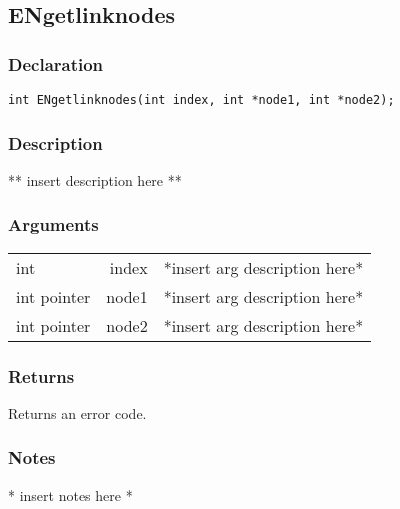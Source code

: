 \subsection{ENgetlinknodes}
\subsubsection{Declaration}
\begin{lstlisting}
int ENgetlinknodes(int index, int *node1, int *node2);
\end{lstlisting}
\subsubsection{Description}
** insert description here **
\subsubsection{Arguments}
\begin{tabular}{l r p{11cm} }
int&index&*insert arg description here* \\[6pt]
int pointer&node1&*insert arg description here* \\[6pt]
int pointer&node2&*insert arg description here* \\[6pt]
\end{tabular}
\subsubsection{Returns}
Returns an error code.
\subsubsection{Notes}
* insert notes here *